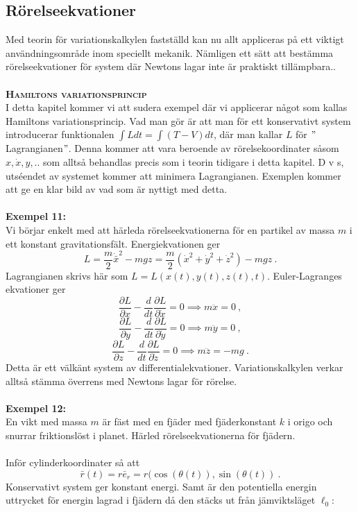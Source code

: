 \documentclass{article}
\begin{document}
\subsection{Rörelseekvationer}
Med teorin för variationskalkylen fastställd kan nu allt appliceras på ett viktigt användningsområde inom speciellt mekanik. Nämligen ett sätt att bestämma rörelseekvationer för system där Newtons lagar inte är praktiskt tillämpbara..\\ \\
\textbf{\textsc{Hamiltons variationsprincip}}\\
I detta kapitel kommer vi att sudera exempel där vi applicerar något som kallas Hamiltons variationsprincip. Vad man gör är att man för ett konservativt system introducerar funktionalen $\int Ldt=\int (T-V)dt$, där man kallar $L$ för $"$Lagrangianen$"$. Denna kommer att vara beroende av rörelsekoordinater såsom $x,\dot{x},y,..$ som alltså behandlas precis som i teorin tidigare i detta kapitel. D v s, utséendet av systemet kommer att minimera Lagrangianen. Exemplen kommer att ge en klar bild av vad som är nyttigt med detta. \\ \\
\textbf{Exempel 11:}\\
Vi börjar enkelt med att härleda rörelseekvationerna för en partikel av massa $m$ i ett konstant gravitationsfält. Energiekvationen ger
$$
L=\frac{m}{2}\dot{\bar{x}}^2-mgz=\frac{m}{2}(\dot{x}^2+\dot{y}^2+\dot{z}^2)-mgz \ .
$$
Lagrangianen skrivs här som $L=L(x(t),y(t),z(t),t)$. Euler-Lagranges ekvationer ger
$$
\frac{\partial L}{\partial x}-\frac{d}{dt}\frac{\partial L}{\partial \dot{x}}=0 \implies m\ddot{x}=0 \ ,
$$
$$
\frac{\partial L}{\partial y}-\frac{d}{dt}\frac{\partial L}{\partial \dot{y}}=0 \implies m\ddot{y}=0 \ ,
$$
$$
\frac{\partial L}{\partial z}-\frac{d}{dt}\frac{\partial L}{\partial \dot{z}}=0 \implies m\ddot{z}=-mg \ .
$$
Detta är ett välkänt system av differentialekvationer. Variationskalkylen verkar alltså stämma överrens med Newtons lagar för rörelse.\\ \\
\textbf{Exempel 12:}\\
En vikt med massa $m$ är fäst med en fjäder med fjäderkonstant $k$ i origo och snurrar friktionslöst i planet. Härled rörelseekvationerna för fjädern. \\ \\
Inför cylinderkoordinater så att
$$
\bar{r}(t)=r\bar{e}_r=r(\cos(\theta(t)),\sin(\theta(t)) \ .
$$
Konservativt system ger konstant energi. Samt är den potentiella energin uttrycket för energin lagrad i fjädern då den stäcks ut från jämviktsläget $\ell_0$:
\end{document}
